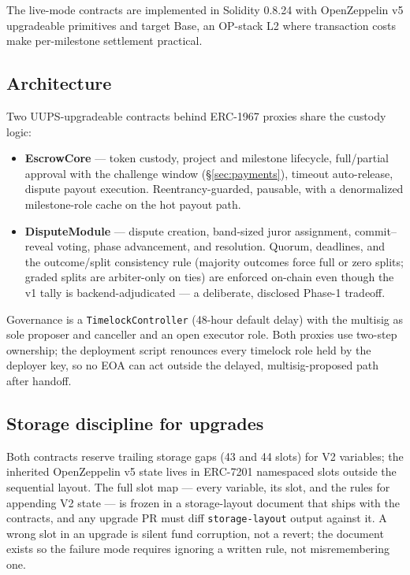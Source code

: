 \documentclass[11pt,letterpaper]{article}
\begin{document}
The live-mode contracts are implemented in Solidity 0.8.24 with OpenZeppelin v5
upgradeable primitives and target Base, an OP-stack L2 where transaction costs make
per-milestone settlement practical.

\subsection{Architecture}

Two UUPS-upgradeable contracts behind ERC-1967 proxies share the custody logic:

\begin{itemize}
\item \textbf{EscrowCore} --- token custody, project and milestone lifecycle,
full/partial approval with the challenge window (\S\ref{sec:payments}), timeout
auto-release, dispute payout execution. Reentrancy-guarded, pausable, with a
denormalized milestone-role cache on the hot payout path.
\item \textbf{DisputeModule} --- dispute creation, band-sized juror assignment,
commit--reveal voting, phase advancement, and resolution. Quorum, deadlines, and the
outcome/split consistency rule (majority outcomes force full or zero splits; graded
splits are arbiter-only on ties) are enforced on-chain even though the v1 tally is
backend-adjudicated --- a deliberate, disclosed Phase-1 tradeoff.
\end{itemize}

Governance is a \texttt{TimelockController} (48-hour default delay) with the
multisig as sole proposer and canceller and an open executor role. Both proxies use
two-step ownership; the deployment script renounces every timelock role held by the
deployer key, so no EOA can act outside the delayed, multisig-proposed path after
handoff.

\subsection{Storage discipline for upgrades}

Both contracts reserve trailing storage gaps (43 and 44 slots) for V2 variables; the
inherited OpenZeppelin v5 state lives in ERC-7201 namespaced slots outside the
sequential layout. The full slot map --- every variable, its slot, and the rules for
appending V2 state --- is frozen in a storage-layout document that ships with the
contracts, and any upgrade PR must diff \texttt{storage-layout} output against it.
A wrong slot in an upgrade is silent fund corruption, not a revert; the document
exists so the failure mode requires ignoring a written rule, not misremembering one.
\end{document}
